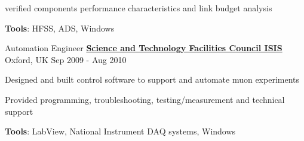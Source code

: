 \begin{cventries}
{\begin{cvitems}
  			\item {verified components performance characteristics and link budget analysis}
  			\item {\textbf{Tools}: HFSS, ADS, Windows}
  		\end{cvitems}
  	}
  \cventry
  	{Automation Engineer}
  	{\href{http://www.isis.stfc.ac.uk/}{\textbf{Science and Technology Facilities Council ISIS}}}
  	{Oxford, UK}
  	{Sep 2009 - Aug 2010}
  	{
  		\begin{cvitems}
  			\item {Designed and built control software to support and automate muon experiments} 
  			\item {Provided programming, troubleshooting, testing/measurement and technical support} 
  			\item {\textbf{Tools}: LabView, National Instrument DAQ systems, Windows}
  		\end{cvitems}
  	}
\end{cventries}

